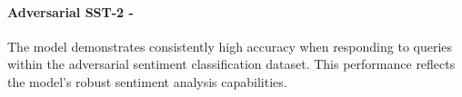 \paragraph{Adversarial SST-2 - \low}
The model demonstrates consistently high accuracy when responding to queries within the adversarial sentiment classification dataset. This performance reflects the model's robust sentiment analysis capabilities. 
